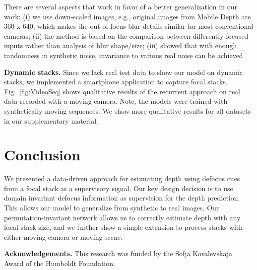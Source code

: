 \documentclass[10pt,twocolumn,letterpaper]{article}
\begin{document}
There are several aspects that work in favor of a better generalization in our work: 
(i) we use down-scaled images, e.g., original images from Mobile Depth are 360 x 640, which makes the out-of-focus blur details similar for most conventional cameras; (ii) the method is based on the comparison between differently focused inputs rather than analysis of blur shape/size; (iii) \cite{Aittala18} showed that with enough randomness in synthetic noise, invariance to various real noise can be achieved. 


\noindent\textbf{Dynamic stacks.} Since we lack real test data to show our model on dynamic stacks, we implemented a smartphone application to capture focal stacks. Fig.~\ref{fig:VideoSeq} shows qualitative results of the recurrent approach on real data recorded with a moving camera. Note, the models were trained with synthetically moving sequences.
We show more qualitative results for all datasets in our supplementary material.



\section{Conclusion}


We presented a data-driven approach for estimating depth using defocus cues from a focal stack as a supervisory signal. 
Our key design decision is to use domain invariant defocus information as supervision for the depth prediction. This allows our model to generalize from synthetic to real images.
Our permutation-invariant network allows us to correctly estimate depth with any focal stack size, and we further show a simple extension to process stacks with either moving camera or moving scene.

\textbf{Acknowledgements.} This research was funded by the Sofja Kovalevskaja Award of the Humboldt Foundation.

{\small


}
\end{document}
